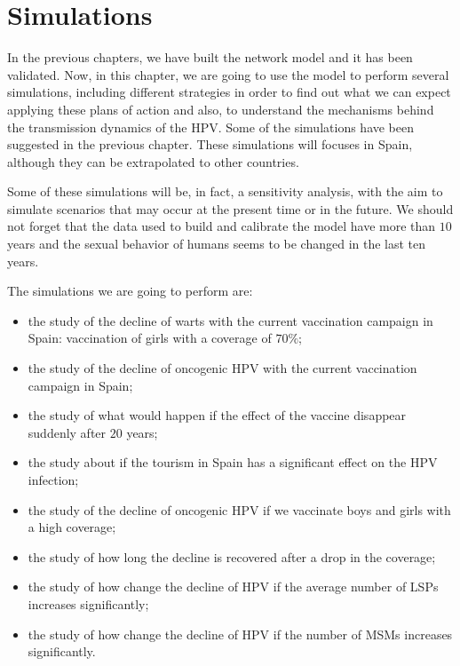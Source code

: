 \chapter{Simulations}\label{HPVSpain}
In the previous chapters, we have built the network model and it has been validated. Now, in this chapter, we are going to use the model to perform several simulations, including different strategies in order to find out what we can expect applying these plans of action and also, to understand the mechanisms behind the transmission dynamics of the HPV. Some of the simulations have been suggested in the previous chapter. These simulations will focuses in Spain, although they can be extrapolated to other countries. 

Some of these simulations will be, in fact, a sensitivity analysis, with the aim to simulate scenarios that may occur at the present time or in the future. We should not forget that the data used to build and calibrate the model have more than $10$ years and the sexual behavior of humans seems to be changed in the last ten years.

The simulations we are going to perform are:

\begin{itemize}
\item the study of the decline of warts with the current vaccination campaign in Spain: vaccination of girls with a coverage of $70\%$;
\item the study of the decline of oncogenic HPV with the current vaccination campaign in Spain;
\item the study of what would happen if the effect of the vaccine disappear suddenly after $20$ years;
\item the study about if the tourism in Spain has a significant effect on the HPV infection;
\item the study of the decline of oncogenic HPV if we vaccinate boys and girls with a high coverage;
\item the study of how long the decline is recovered after a drop in the coverage;
\item the study of how change the decline of HPV if the average number of LSPs increases significantly;
\item the study of how change the decline of HPV if the number of MSMs increases significantly.
\end{itemize}

